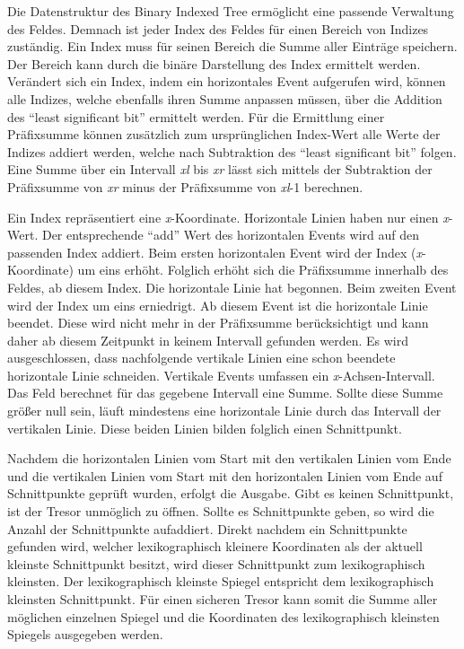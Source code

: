 Die Datenstruktur des Binary Indexed Tree ermöglicht eine passende Verwaltung des Feldes. Demnach ist jeder Index des Feldes für einen Bereich von Indizes zuständig. Ein Index muss für seinen Bereich die Summe aller Einträge speichern. Der Bereich kann durch die binäre Darstellung des Index  ermittelt werden. Verändert sich ein Index, indem ein horizontales Event aufgerufen wird, können alle Indizes, welche ebenfalls ihren Summe anpassen müssen, über die Addition des “least significant bit” ermittelt werden. Für die Ermittlung einer Präfixsumme können zusätzlich zum ursprünglichen Index-Wert alle Werte der Indizes addiert werden, welche nach Subtraktion des “least significant bit” folgen. Eine Summe über ein Intervall \textit{xl} bis \textit{xr} lässt sich mittels der Subtraktion der Präfixsumme von \textit{xr} minus der Präfixsumme von \textit{xl}-1 berechnen.

Ein Index repräsentiert eine \textit{x}-Koordinate. Horizontale Linien haben nur einen \textit{x}-Wert. Der entsprechende “add” Wert des horizontalen Events wird auf den passenden Index addiert. Beim ersten horizontalen Event wird der Index (\textit{x}-Koordinate) um eins erhöht. Folglich erhöht sich die Präfixsumme innerhalb des Feldes, ab diesem Index. Die horizontale Linie hat begonnen. Beim zweiten Event wird der Index um eins erniedrigt. Ab diesem Event ist die horizontale Linie beendet. Diese wird nicht mehr in der Präfixsumme berücksichtigt und kann daher ab diesem Zeitpunkt in keinem Intervall gefunden werden. Es wird ausgeschlossen, dass nachfolgende vertikale Linien eine schon beendete horizontale Linie schneiden. Vertikale Events umfassen ein \textit{x}-Achsen-Intervall. Das Feld berechnet für das gegebene Intervall eine Summe. Sollte diese Summe größer null sein, läuft mindestens eine horizontale Linie durch das Intervall der vertikalen Linie. Diese beiden Linien bilden folglich einen Schnittpunkt. 

Nachdem die horizontalen Linien vom Start mit den vertikalen Linien vom Ende und die vertikalen Linien vom Start mit den horizontalen Linien vom Ende auf Schnittpunkte geprüft wurden, erfolgt die Ausgabe. Gibt es keinen Schnittpunkt, ist der Tresor unmöglich zu öffnen. Sollte es Schnittpunkte geben, so wird die Anzahl der Schnittpunkte aufaddiert. Direkt nachdem ein Schnittpunkte gefunden wird, welcher lexikographisch kleinere Koordinaten als der aktuell kleinste Schnittpunkt besitzt, wird dieser Schnittpunkt zum lexikographisch kleinsten. Der lexikographisch kleinste Spiegel entspricht dem lexikographisch kleinsten Schnittpunkt. Für einen sicheren Tresor kann somit die Summe aller möglichen einzelnen Spiegel und die Koordinaten des lexikographisch kleinsten Spiegels ausgegeben werden.
%
